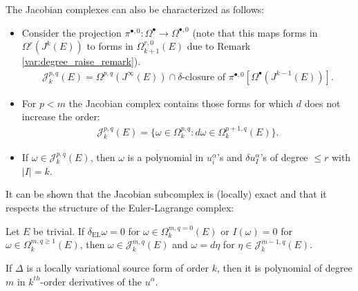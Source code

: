     \begin{property}
        The Jacobian complexes can also be characterized as follows:
        \begin{itemize}
            \item Consider the projection $\pi^{\bullet,0}:\Omega^\bullet\rightarrow\Omega^{\bullet,0}$ (note that this maps forms in $\Omega^r(J^k(E))$ to forms in $\Omega^{r,0}_{k+1}(E)$ due to Remark \ref{var:degree_raise_remark}).
            \begin{gather}
                \mathcal{J}^{p,q}_k(E) = \Omega^{p,q}(J^\infty(E))\cap\delta\text{-closure of }\pi^{\bullet,0}\left[\Omega^\bullet(J^{k-1}(E))\right].
            \end{gather}
            \item For $p<m$ the Jacobian complex contains those forms for which $d$ does not increase the order:
            \begin{gather}
                \mathcal{J}^{p,q}_k(E) = \{\omega\in\Omega^{p,q}_k:d\omega\in\Omega^{p+1,q}_k(E)\}.
            \end{gather}
            \item If $\omega\in\mathcal{J}^{p,q}_k(E)$, then $\omega$ is a polynomial in $u^\alpha_i$'s and $\delta u^\alpha_I$'s of degree $\leq r$ with $|I|=k$.
        \end{itemize}
    \end{property}

    It can be shown that the Jacobian subcomplex is (locally) exact and that it respects the structure of the Euler-Lagrange complex:
    \begin{property}[Exactness]
        Let $E$ be trivial. If $\delta_{\text{EL}}\omega=0$ for $\omega\in\Omega^{m,q=0}_k(E)$ or $I(\omega)=0$ for $\omega\in\Omega^{m,q\geq1}_k(E)$, then $\omega\in\mathcal{J}^{m,q}_k(E)$ and $\omega=d\eta$ for $\eta\in\mathcal{J}^{m-1,q}_k(E)$.
    \end{property}

    \begin{property}
        If $\Delta$ is a locally variational source form of order $k$, then it is polynomial of degree $m$ in $k^{th}$-order derivatives of the $u^\alpha$.
    \end{property}